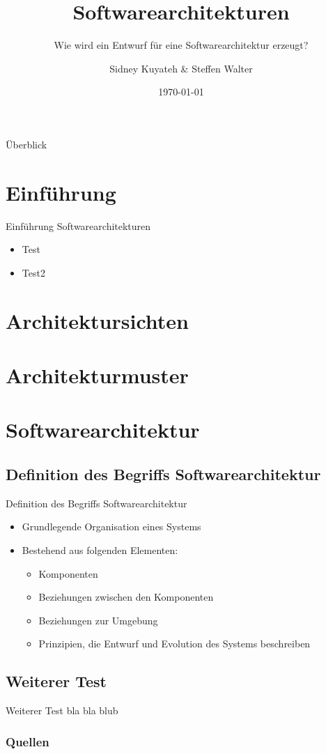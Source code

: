 \documentclass{beamer}
\title{Softwarearchitekturen}
\subtitle{Wie wird ein Entwurf für eine Softwarearchitektur erzeugt?}
\author{Sidney Kuyateh \& Steffen Walter}
\institute{Duale Hochschule Baden-Württemberg}
\date{\today}
\begin{document}
	\maketitle
	\begin{frame}{Überblick}
		\tableofcontents
	\end{frame}
		\section{Einführung}
		\begin{frame}{Einführung Softwarearchitekturen}
			\begin{itemize}
				\item Test
				\item Test2\cite[ S. 12]{prinzip}
			\end{itemize}
	\end{frame}
		
		\section{Architektursichten}
		\section{Architekturmuster}
	
	\section{Softwarearchitektur}
		\subsection{Definition des Begriffs Softwarearchitektur}
			\begin{frame}{Definition des Begriffs Softwarearchitektur}
				\begin{itemize}
					\item Grundlegende Organisation eines Systems
					\item Bestehend aus folgenden Elementen:
					\begin{itemize}
						\item Komponenten
						\item Beziehungen zwischen den Komponenten
						\item Beziehungen zur Umgebung
						\item Prinzipien, die Entwurf und Evolution des Systems beschreiben
					\end{itemize}
				\end{itemize}
			\end{frame}
		\subsection{Weiterer Test}
			\begin{frame}{Weiterer Test}
				bla bla blub
			\end{frame}
	\begin{frame}[allowframebreaks]
		\frametitle{Quellen}
		
		
	\end{frame}
\end{document}
